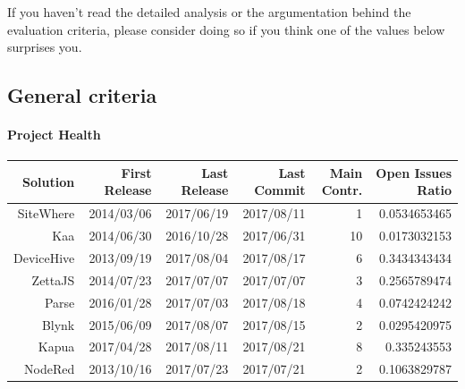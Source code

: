 \documentclass{article}
\begin{document}
If you haven't read the detailed analysis or the argumentation behind the evaluation criteria, please consider doing so if you think one of the values below surprises you.

\subsection{General criteria}

\paragraph{Project Health}

\begin{center}
\begin{tabular}{r|r|r|r|r|r}
Solution & First Release & Last Release & Last Commit & Main Contr. & Open Issues Ratio \\ \hline
SiteWhere & \cellcolor{green!25}2014/03/06 & \cellcolor{green!25}2017/06/19 & \cellcolor{green!25}2017/08/11 & \cellcolor{red!25}1 & \cellcolor{green!25}0.0534653465 \\
Kaa & \cellcolor{green!25}2014/06/30 & \cellcolor{orange!25}2016/10/28 & \cellcolor{green!25}2017/06/31 & \cellcolor{green!25}10 & \cellcolor{green!25}0.0173032153 \\
DeviceHive & \cellcolor{green!25}2013/09/19 & \cellcolor{green!25}2017/08/04 & \cellcolor{green!25}2017/08/17 & \cellcolor{green!25}6 & \cellcolor{red!25}0.3434343434 \\
ZettaJS & \cellcolor{green!25}2014/07/23 & \cellcolor{green!25}2017/07/07 & \cellcolor{green!25}2017/07/07 & \cellcolor{orange!25}3 & \cellcolor{red!25}0.2565789474 \\
Parse & \cellcolor{orange!25}2016/01/28 & \cellcolor{green!25}2017/07/03 & \cellcolor{green!25}2017/08/18 & \cellcolor{orange!25}4 & \cellcolor{green!25}0.0742424242 \\
Blynk & \cellcolor{green!25}2015/06/09 & \cellcolor{green!25}2017/08/07 & \cellcolor{green!25}2017/08/15 & \cellcolor{orange!25}2 & \cellcolor{green!25}0.0295420975 \\
Kapua & \cellcolor{red!25}2017/04/28 & \cellcolor{green!25}2017/08/11 & \cellcolor{green!25}2017/08/21 & \cellcolor{green!25}8 & \cellcolor{red!25}0.335243553 \\
NodeRed & \cellcolor{green!25}2013/10/16 & \cellcolor{green!25}2017/07/23 & \cellcolor{green!25}2017/07/21 & \cellcolor{orange!25}2 & \cellcolor{orange!25}0.1063829787 \\
\end{tabular}
\end{center}
\end{document}
